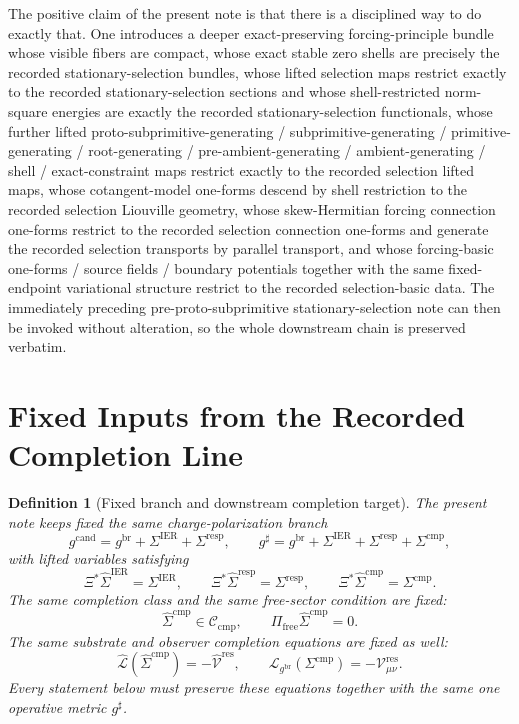 \documentclass[11pt]{article}
\newcommand{\ObserverMap}{\Xi}
\newcommand{\ObserverMetric}{g^{\mathrm{br}}}
\newcommand{\CandidateMetric}{g^{\mathrm{cand}}}
\newcommand{\CompletedMetric}{g^{\sharp}}
\newcommand{\BaseShift}{\Sigma^{\mathrm{IER}}}
\newcommand{\ResponseShift}{\Sigma^{\mathrm{resp}}}
\newcommand{\CompShift}{\Sigma^{\mathrm{cmp}}}
\newcommand{\BaseLift}{\widehat\Sigma^{\mathrm{IER}}}
\newcommand{\ResponseLift}{\widehat\Sigma^{\mathrm{resp}}}
\newcommand{\CompLift}{\widehat\Sigma^{\mathrm{cmp}}}
\newcommand{\ResidualCore}{\mathcal V_{\mu\nu}^{\mathrm{res}}}
\newcommand{\ResidualLift}{\widehat{\mathcal V}^{\mathrm{res}}}
\newcommand{\SubReducedEin}{\widehat{\mathcal L}}
\newcommand{\FreeProj}{\Pi_{\mathrm{free}}}
\newcommand{\ReducedEin}{\mathcal L_{\ObserverMetric}}
\newcommand{\CompClass}{\mathscr C_{\mathrm{cmp}}}
\newtheorem{definition}{Definition}
\begin{document}
The positive claim of the present note is that there is a disciplined way to do exactly that. One introduces a deeper exact-preserving forcing-principle bundle whose visible fibers are compact, whose exact stable zero shells are precisely the recorded stationary-selection bundles, whose lifted selection maps restrict exactly to the recorded stationary-selection sections and whose shell-restricted norm-square energies are exactly the recorded stationary-selection functionals, whose further lifted proto-subprimitive-generating / subprimitive-generating / primitive-generating / root-generating / pre-ambient-generating / ambient-generating / shell / exact-constraint maps restrict exactly to the recorded selection lifted maps, whose cotangent-model one-forms descend by shell restriction to the recorded selection Liouville geometry, whose skew-Hermitian forcing connection one-forms restrict to the recorded selection connection one-forms and generate the recorded selection transports by parallel transport, and whose forcing-basic one-forms / source fields / boundary potentials together with the same fixed-endpoint variational structure restrict to the recorded selection-basic data. The immediately preceding pre-proto-subprimitive stationary-selection note can then be invoked without alteration, so the whole downstream chain is preserved verbatim.

\section{Fixed Inputs from the Recorded Completion Line}

\begin{definition}[Fixed branch and downstream completion target]
\label{def:fixed_branch}
The present note keeps fixed the same charge-polarization branch
\begin{equation}
\CandidateMetric
=
\ObserverMetric+\BaseShift+\ResponseShift,
\qquad
\CompletedMetric
=
\ObserverMetric+\BaseShift+\ResponseShift+\CompShift,
\label{eq:fixed_metrics}
\end{equation}
with lifted variables satisfying
\begin{equation}
\ObserverMap^*\BaseLift=\BaseShift,
\qquad
\ObserverMap^*\ResponseLift=\ResponseShift,
\qquad
\ObserverMap^*\CompLift=\CompShift.
\label{eq:fixed_lifts}
\end{equation}
The same completion class and the same free-sector condition are fixed:
\begin{equation}
\CompLift\in\CompClass,
\qquad
\FreeProj\CompLift=0.
\label{eq:fixed_free}
\end{equation}
The same substrate and observer completion equations are fixed as well:
\begin{equation}
\SubReducedEin(\CompLift)=-\ResidualLift,
\qquad
\ReducedEin(\CompShift)=-\ResidualCore.
\label{eq:fixed_solves}
\end{equation}
Every statement below must preserve these equations together with the same one operative metric \(\CompletedMetric\).
\end{definition}
\end{document}
